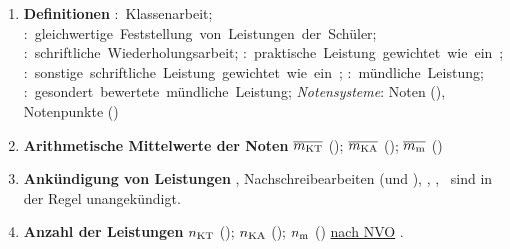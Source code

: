 \begin{enumerate}[label=\textbf{(\arabic*)}, align=left, leftmargin=*]
	\item \textbf{Definitionen} { \thisfontsize \mbox{\textbf{}: Klassenarbeit}; \mbox{\textbf{}: gleichwertige Feststellung von Leistungen der Schüler}; \mbox{\textbf{}: schriftliche Wiederholungsarbeit};  \linebreak \mbox{\textbf{}: praktische Leistung gewichtet wie ein }; \mbox{\textbf{}: sonstige schriftliche Leistung gewichtet wie ein };   \linebreak \mbox{\textbf{}: mündliche Leistung}; \mbox{\textbf{}: gesondert bewertete mündliche Leistung}; \textit{Notensysteme}: Noten (\textbf{}), Notenpunkte (\textbf{}) }
	
	\item \textbf{Arithmetische Mittelwerte der Noten}  { \thisfontsize $\overline{m_{\mathrm{KT}}}$ (\catkt); $\overline{m_{\mathrm{KA}}}$ (\catka); $\overline{m_{\mathrm{m}}}$ (\catm) }
	
	
	\item \textbf{Ankündigung von Leistungen} { \thisfontsize {}, Nachschreibearbeiten ( und ), , , \catm~sind in der Regel unangekündigt.}
	\item \textbf{Anzahl der Leistungen} { \thisfontsize $n_{\mathrm{KT}}$ (\catkt); $n_{\mathrm{KA}}$ (\catka); $n_{\mathrm{m}}$ (\catm) \href{\nvourl}{nach NVO} \cite{nvo}}.
	

\end{enumerate}
